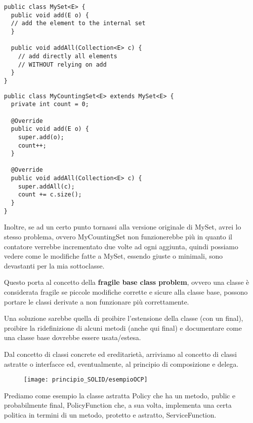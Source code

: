 \begin{multicols}{2}
\begin{lstlisting}
public class MySet<E> {
  public void add(E o) {
  // add the element to the internal set
  }

  public void addAll(Collection<E> c) {
    // add directly all elements
    // WITHOUT relying on add
  }
}
\end{lstlisting}
\columnbreak
\begin{lstlisting}
public class MyCountingSet<E> extends MySet<E> {
  private int count = 0;
  
  @Override
  public void add(E o) {
    super.add(o);
    count++;
  }

  @Override
  public void addAll(Collection<E> c) {
    super.addAll(c);
    count += c.size();
  }
} 
\end{lstlisting}
\end{multicols}

Inoltre, se ad un certo punto tornassi alla versione originale di MySet, avrei lo stesso problema, ovvero MyCountingSet non funzionerebbe più in quanto il contatore 
verrebbe incrementato due volte ad ogni aggiunta, quindi possiamo vedere come le modifiche fatte a MySet, essendo giuste o minimali, sono devastanti per la mia 
sottoclasse.
\smallskip

Questo porta al concetto della \textbf{fragile base class problem}, ovvero una classe è considerata fragile se piccole modifiche corrette e sicure alla classe base, 
possono portare le classi derivate a non funzionare più correttamente.

Una soluzione sarebbe quella di proibire l'estensione della classe (con un final), proibire la ridefinizione di alcuni metodi (anche qui final) e documentare come una 
classe base dovrebbe essere usata/estesa.
\smallskip

Dal concetto di classi concrete ed ereditarietà, arriviamo al concetto di classi astratte o interfacce ed, eventualmente, al principio di composizione e delega.

\begin{wrapfigure}{r}{3cm}
  \texttt{[image: principio\_SOLID/esempioOCP]}  
\end{wrapfigure}

Prediamo come esempio la classe astratta Policy che ha un metodo, public e probabilmente final, PolicyFunction che, a sua volta, implementa una certa politica in 
termini di un metodo, protetto e astratto, ServiceFunction.

